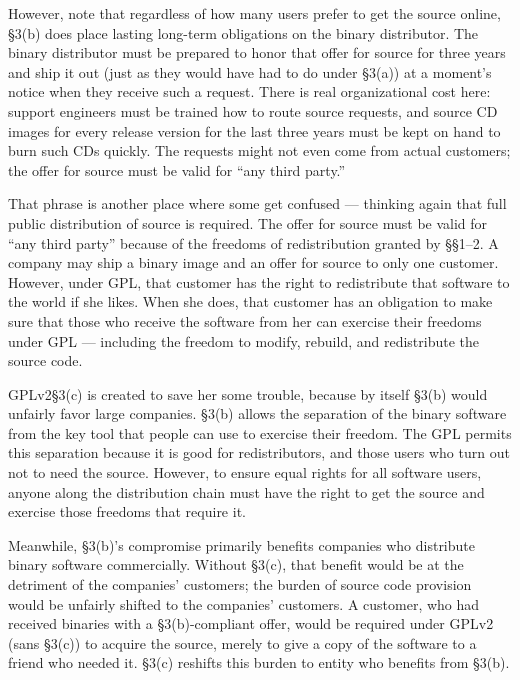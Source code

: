 However, note that regardless of how many users prefer to get the
source online, \S 3(b) does place lasting long-term obligations on the
binary distributor. The binary distributor must be prepared to honor
that offer for source for three years and ship it out (just as they
would have had to do under \S 3(a)) at a moment's notice when they
receive such a request. There is real organizational cost here:
support engineers must be trained how to route source requests, and
source CD images for every release version for the last three years
must be kept on hand to burn such CDs quickly. The requests might not
even come from actual customers; the offer for source must be valid
for ``any third party.''

That phrase is another place where some get confused --- thinking again
that full public distribution of source is required. The offer for source
must be valid for ``any third party'' because of the freedoms of
redistribution granted by \S\S 1--2. A company may ship a binary image
and an offer for source to only one customer. However, under GPL, that
customer has the right to redistribute that software to the world if she
likes. When she does, that customer has an obligation to make sure that
those who receive the software from her can exercise their freedoms under
GPL --- including the freedom to modify, rebuild, and redistribute the
source code.

GPLv2\S 3(c) is created to save her some trouble, because by itself \S 3(b)
would unfairly favor large companies. \S 3(b) allows the
separation of the binary software from the key tool that people can use
to exercise their freedom. The GPL permits this separation because it is
good for redistributors, and those users who turn out not to need the
source. However, to ensure equal rights for all software users, anyone
along the distribution chain must have the right to get the source and
exercise those freedoms that require it.

Meanwhile, \S 3(b)'s compromise primarily benefits companies who
distribute binary software commercially. Without \S 3(c), that benefit
would be at the detriment of the companies' customers; the burden of
source code provision would be unfairly shifted to the companies'
customers. A customer, who had received binaries with a \S 3(b)-compliant
offer, would be required under GPLv2 (sans \S 3(c)) to acquire the source,
merely to give a copy of the software to a friend who needed it. \S 3(c)
reshifts this burden to entity who benefits from \S 3(b).

